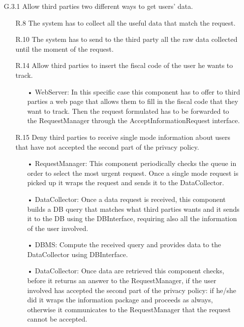 \begin{enumerate}
\item [G.3.1] Allow third parties two different ways to get users’ data.
	\begin{enumerate}
	\item [R.8] The system has to collect all the useful data that match the request.
	\item [R.10] The system has to send to the third party all the raw data collected until the moment of the request.
	\item [R.14] Allow third parties to insert the fiscal code of the user he wants to track.
		\begin{enumerate}
		\item[•] WebServer: In this specific case this component has to offer to third parties a web page that allows them to fill in the fiscal code that they want to track. Then the request formulated has to be forwarded to the RequestManager through the AcceptInformationRequest interface.
		\end{enumerate}	
		
	\item [R.15] Deny third parties to receive single mode information about users that have not accepted the second part of the privacy policy.
		\begin{enumerate}
		\item[•] RequestManager: This component periodically checks the queue in order to select the most urgent request. Once a single mode request is picked up it wraps the request and sends it to the DataCollector.
		\item[•] DataCollector: Once a data request is received, this component builds a DB query that matches what third parties wants and it sends it to the DB using the DBInterface, requiring also all the information of the user involved.
		\item[•] DBMS: Compute the received query and provides data to the DataCollector using DBInterface.
		\item[•] DataCollector: Once data are retrieved this component checks, before it returns an answer to the RequestManager, if the user involved has accepted the second part of the privacy policy: if he/she did it wraps the information package and proceeds as always, otherwise it communicates to the RequestManager that the request cannot be accepted.
		\end{enumerate}	
	\end{enumerate}
	

\end{enumerate}
